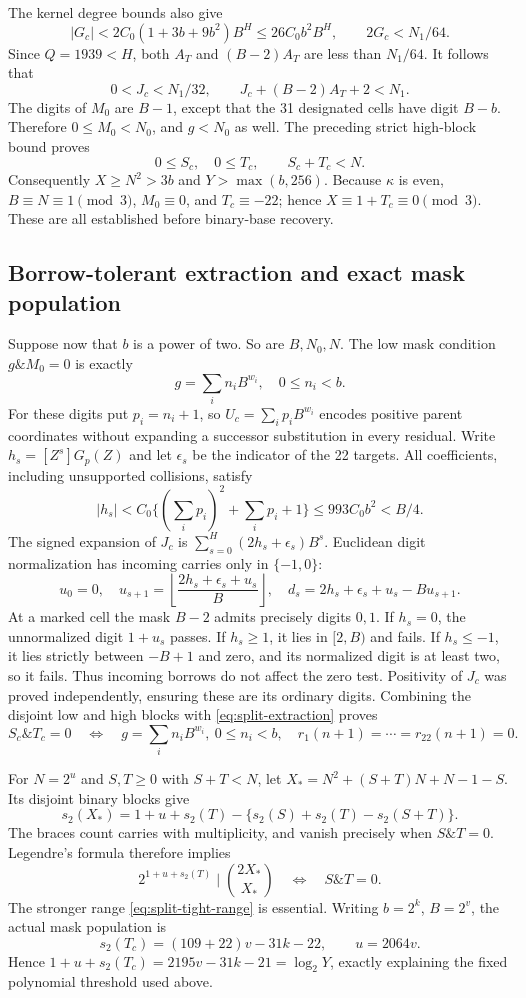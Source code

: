 The kernel degree bounds also give
\[
 |G_c|<2C_0(1+3b+9b^2)B^H\le26C_0b^2B^H,\qquad
 2G_c<N_1/64.
\]
Since $Q=1939<H$, both $A_T$ and $(B-2)A_T$ are less than $N_1/64$.
It follows that
\[
 0<J_c<N_1/32,\qquad J_c+(B-2)A_T+2<N_1.
\]
The digits of $M_0$ are $B-1$, except that the 31 designated cells
have digit $B-b$. Therefore $0\le M_0<N_0$, and $g<N_0$ as well.
The preceding strict high-block bound proves
\begin{equation}\label{eq:split-tight-range}
 0\le S_c,\quad0\le T_c,\qquad S_c+T_c<N.
\end{equation}
Consequently $X\ge N^2>3b$ and $Y>\max(b,256)$. Because $\kappa$ is
even, $B\equiv N\equiv1\pmod3$, $M_0\equiv0$, and
$T_c\equiv-22$; hence $X\equiv1+T_c\equiv0\pmod3$.
These are all established before binary-base recovery.

\subsection{Borrow-tolerant extraction and exact mask population}

Suppose now that $b$ is a power of two. So are $B,N_0,N$. The low
mask condition $g\mathbin{\&}M_0=0$ is exactly
\[
 g=\sum_i n_iB^{w_i},\quad0\le n_i<b.
\]
For these digits put $p_i=n_i+1$, so $U_c=\sum_i p_iB^{w_i}$ encodes
positive parent coordinates without expanding a successor substitution
in every residual. Write $h_s=[Z^s]G_p(Z)$ and let $\epsilon_s$ be the
indicator of the 22 targets. All coefficients, including unsupported
collisions, satisfy
\[
 |h_s|<C_0\{(\sum_i p_i)^2+\sum_i p_i+1\}
 \le993C_0b^2<B/4.
\]
The signed expansion of $J_c$ is $\sum_{s=0}^{H}(2h_s+\epsilon_s)B^s$.
Euclidean digit normalization has incoming carries only in $\{-1,0\}$:
\[
 u_0=0,\quad u_{s+1}=\left\lfloor\frac{2h_s+\epsilon_s+u_s}{B}\right\rfloor,
 \quad d_s=2h_s+\epsilon_s+u_s-Bu_{s+1}.
\]
At a marked cell the mask $B-2$ admits precisely digits $0,1$.
If $h_s=0$, the unnormalized digit $1+u_s$ passes. If $h_s\ge1$,
it lies in $[2,B)$ and fails. If $h_s\le-1$, it lies strictly between
$-B+1$ and zero, and its normalized digit is at least two, so it fails.
Thus incoming borrows do not affect the zero test. Positivity of $J_c$
was proved independently, ensuring these are its ordinary digits.
Combining the disjoint low and high blocks with
\eqref{eq:split-extraction} proves
\[
 S_c\mathbin{\&}T_c=0
 \quad\Longleftrightarrow\quad
 g=\sum_i n_iB^{w_i},\ 0\le n_i<b,\quad r_1(n+1)=\cdots=r_{22}(n+1)=0.
\]

For $N=2^u$ and $S,T\ge0$ with $S+T<N$, let
$X_*=N^2+(S+T)N+N-1-S$. Its disjoint binary blocks give
\[
 s_2(X_*)=1+u+s_2(T)-\{s_2(S)+s_2(T)-s_2(S+T)\}.
\]
The braces count carries with multiplicity, and vanish precisely when
$S\mathbin{\&}T=0$. Legendre's formula therefore implies
\[
 2^{1+u+s_2(T)}\mid\binom{2X_*}{X_*}
 \quad\Longleftrightarrow\quad S\mathbin{\&}T=0.
\]
The stronger range \eqref{eq:split-tight-range} is essential.
Writing $b=2^k$, $B=2^v$, the actual mask population is
\[
 s_2(T_c)=(109+22)v-31k-22,\qquad u=2064v.
\]
Hence $1+u+s_2(T_c)=2195v-31k-21=\log_2Y$, exactly explaining the
fixed polynomial threshold used above.

